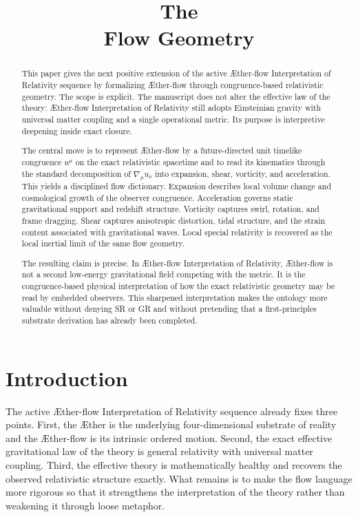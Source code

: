 \documentclass[11pt]{article}
\title{\textbf{The \TheoryName{}}\\[0.4em]
\large Flow Geometry}
\author{}
\date{}
\newcommand{\Aether}{\AE{}ther}
\newcommand{\Aflow}{\AE{}ther-flow}
\newcommand{\TheoryName}{\Aflow{} Interpretation of Relativity}
\begin{document}
\maketitle

\begin{abstract}
This paper gives the next positive extension of the active \TheoryName{} sequence by formalizing \Aflow{} through congruence-based relativistic geometry. The scope is explicit. The manuscript does not alter the effective law of the theory: \TheoryName{} still adopts Einsteinian gravity with universal matter coupling and a single operational metric. Its purpose is interpretive deepening inside exact closure.

The central move is to represent \Aflow{} by a future-directed unit timelike congruence \(u^\mu\) on the exact relativistic spacetime and to read its kinematics through the standard decomposition of \(\nabla_\mu u_\nu\) into expansion, shear, vorticity, and acceleration. This yields a disciplined flow dictionary. Expansion describes local volume change and cosmological growth of the observer congruence. Acceleration governs static gravitational support and redshift structure. Vorticity captures swirl, rotation, and frame dragging. Shear captures anisotropic distortion, tidal structure, and the strain content associated with gravitational waves. Local special relativity is recovered as the local inertial limit of the same flow geometry.

The resulting claim is precise. In \TheoryName{}, \Aflow{} is not a second low-energy gravitational field competing with the metric. It is the congruence-based physical interpretation of how the exact relativistic geometry may be read by embedded observers. This sharpened interpretation makes the ontology more valuable without denying SR or GR and without pretending that a first-principles substrate derivation has already been completed.
\end{abstract}

\section{Introduction}

The active \TheoryName{} sequence already fixes three points. First, the \Aether{} is the underlying four-dimensional substrate of reality and the \Aflow{} is its intrinsic ordered motion. Second, the exact effective gravitational law of the theory is general relativity with universal matter coupling. Third, the effective theory is mathematically healthy and recovers the observed relativistic structure exactly. What remains is to make the flow language more rigorous so that it strengthens the interpretation of the theory rather than weakening it through loose metaphor.
\end{document}
